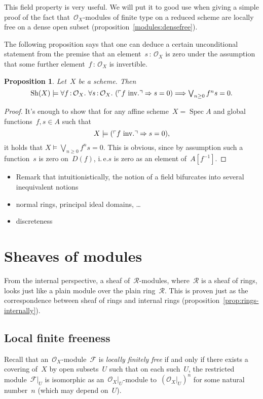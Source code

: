 \documentclass[10pt]{amsart}
\makeatletter
\theoremstyle{definition}
\theoremstyle{plain}
\newtheorem{prop}[defn]{Proposition}
\theoremstyle{remark}
\newcommand{\F}{\mathcal{F}}
\renewcommand{\O}{\mathcal{O}}
\newcommand{\R}{\mathcal{R}}
\newcommand{\Sh}{\mathrm{Sh}}
\DeclareMathOperator{\Spec}{Spec}
\newcommand{\?}{\,{:}\,}
\renewcommand{\_}{\mathpunct{.}\,}
\newcommand{\speak}[1]{\ulcorner\text{\textnormal{#1}}\urcorner}
\newcommand{\ie}{i.\,e.\@\xspace}
\makeatother
\begin{document}
This field property is very useful. We will put it to good use when giving a
simple proof of the fact that~$\O_X$-modules of finite type on a reduced scheme
are locally free on a dense open subset (proposition~\ref{modules:densefree}).

The following proposition says that one can deduce a certain unconditional
statement from the premise that an element~$s\?\O_X$ is zero under the
assumption that some further element~$f\?\O_X$ is invertible.

\begin{prop}\label{prop:cond-zero}
Let~$X$ be a scheme. Then
\[ \Sh(X) \models
  \forall f\?\O_X\_
  \forall s\?\O_X\_
  (\speak{$f$ inv.} \Rightarrow s = 0) \Longrightarrow
  \textstyle
  \bigvee_{n \geq 0} f^n s = 0. \]
\end{prop}
\begin{proof}It's enough to show that for any affine scheme~$X = \Spec A$ and
global functions~$f, s \in A$ such that
\[ X \models (\speak{$f$ inv.} \Rightarrow s = 0), \]
it holds that $X \models \textstyle \bigvee_{n \geq 0} f^n s = 0$. This is
obvious, since by assumption such a function~$s$ is zero on~$D(f)$, \ie $s$
is zero as an element of~$A[f^{-1}]$.
\end{proof}

\begin{itemize}
\item Remark that intuitionistically, the notion of a field bifurcates into
several inequivalent notions
\item normal rings, principal ideal domains, \ldots
\item discreteness
\end{itemize}


\section{Sheaves of modules}

From the internal perspective, a sheaf of~$\R$-modules, where~$\R$ is a sheaf
of rings, looks just like a plain module over the plain ring~$\R$. This is
proven just as the correspondence between sheaf of rings and internal rings
(proposition~\ref{prop:rings-internally}).


\subsection{Local finite freeness}

Recall that an~$\O_X$-module~$\F$ is \emph{locally finitely free} if and only
if there exists a covering of~$X$ by open subsets~$U$ such that on each
such~$U$, the restricted module~$\F|_U$ is isomorphic as an~$\O_X|_U$-module
to~$(\O_X|_U)^n$ for some natural number~$n$ (which may depend on~$U$).
\end{document}
